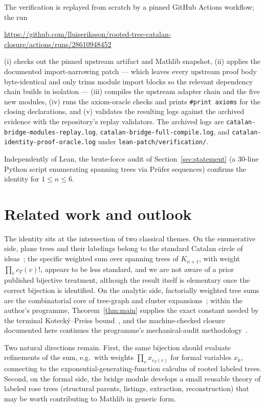 \documentclass[11pt]{article}
\theoremstyle{remark}
\theoremstyle{definition}
\begin{document}
The verification is replayed from scratch by a pinned GitHub Actions
workflow; the run
\begin{center}
\url{https://github.com/lluiseriksson/rooted-tree-catalan-closure/actions/runs/28610948452}
\end{center}
(i) checks out the pinned upstream artifact and Mathlib snapshot,
(ii) applies the documented import-narrowing patch --- which leaves every
upstream proof body byte-identical and only trims module import blocks so the
relevant dependency chain builds in isolation ---
(iii) compiles the upstream adapter chain and the five new modules,
(iv) runs the axiom-oracle checks and prints \texttt{\#print axioms} for the
closing declarations, and
(v) validates the resulting logs against the archived evidence with the
repository's replay validators.
The archived logs are
\texttt{catalan-bridge-modules-replay.log},
\texttt{catalan-bridge-full-compile.log}, and
\texttt{catalan-identity-proof-oracle.log} under
\texttt{lean-patch/verification/}.

Independently of Lean, the brute-force audit of
Section~\ref{sec:statement} (a $30$-line Python script enumerating spanning
trees via Pr\"ufer sequences) confirms the identity for $1 \le n \le 6$.

\section{Related work and outlook}\label{sec:related}

The identity sits at the intersection of two classical themes.  On the
enumerative side, plane trees and their labelings belong to the standard
Catalan circle of ideas~\cite{Stanley2015}; the specific weighted sum over
spanning trees of $K_{n+1}$, with weight $\prod_v c_T(v)!$, appears to be less
standard, and we are not aware of a prior published bijective treatment,
although the result itself is elementary once the correct bijection is
identified.  On the analytic side, factorially weighted tree sums are the
combinatorial core of tree-graph and cluster
expansions~\cite{Penrose1967,KoteckyPreiss1986}; within the author's
programme, Theorem~\ref{thm:main} supplies the exact constant needed by the
terminal Koteck\'y--Preiss bound~\cite{Eriksson2026KP}, and the machine-checked
closure documented here continues the programme's mechanical-audit
methodology~\cite{Eriksson2026Audit}.

Two natural directions remain.  First, the same bijection should evaluate
refinements of the sum, e.g.\ with weights $\prod_v x_{c_T(v)}$ for formal
variables $x_k$, connecting to the exponential-generating-function calculus of
rooted labeled trees.  Second, on the formal side, the bridge module develops
a small reusable theory of labeled rose trees (structural parents, listings,
extraction, reconstruction) that may be worth contributing to Mathlib in
generic form.
\end{document}
